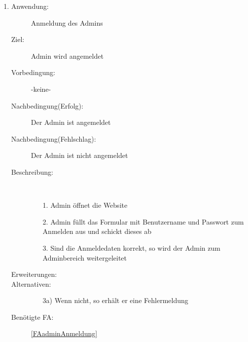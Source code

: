 \documentclass[parskip=full]{scrartcl}
\newcommand{\swtLabel}[1]{\textbf{/#1\arabic*0/}}
\begin{document}
\begin{enumerate} [label=\swtLabel{A}]
	\item \label{UCadminAnmeldung}
    \begin{description}
    \item[Anwendung:] Anmeldung des \gls{Admin}s
    \item[Ziel:] \gls{Admin} wird angemeldet
  	\item[Vorbedingung:] -keine-
  	\item[Nachbedingung(Erfolg):] Der \gls{Admin} ist angemeldet
  	\item[Nachbedingung(Fehlschlag):] Der \gls{Admin} ist nicht angemeldet
  	\item[Beschreibung:]~
  	\begin{enumerate}
  	  \item[1.] \gls{Admin} öffnet die Website
  	  \item[2.] \gls{Admin} füllt das Formular mit \gls{Benutzername} und Passwort zum Anmelden aus und schickt
  	  dieses ab %
  	  \item[3.] Sind die Anmeldedaten korrekt, so wird der \gls{Admin} zum
  	  \gls{Admin}bereich weitergeleitet
  	\end{enumerate}
  	\item[Erweiterungen:]  	
  	\item[Alternativen:]
	\begin{enumerate}
  	  \item[3a)] Wenn nicht, so erhält er eine Fehlermeldung
  	\end{enumerate}
  	\item[Benötigte FA:] \ref{FAadminAnmeldung}
  \end{description}
	

\end{enumerate}
\end{document}
